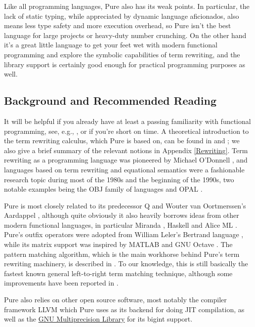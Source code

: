 \documentclass[a4paper,12pt]{article}
\begin{document}
Like all programming languages, Pure also has its weak points. In particular, the lack of static typing, while appreciated by dynamic language aficionados, also means less type safety and more execution overhead, so Pure isn't the best language for large projects or heavy-duty number crunching. On the other hand it's a great little language to get your feet wet with modern functional programming and explore the symbolic capabilities of term rewriting, and the library support is certainly good enough for practical programming purposes as well.

\subsection{Background and Recommended Reading}

It will be helpful if you already have at least a passing familiarity with functional programming, see, e.g., \cite{Hu89}, or \cite{FP} if you're short on time. A theoretical introduction to the term rewriting calculus, which Pure is based on, can be found in \cite{Rewriting} and \cite{DeJo90}; we also give a brief summary of the relevant notions in Appendix \ref{Rewriting}. Term rewriting as a programming language was pioneered by Michael O'Donnell \cite{Do85}, and languages based on term rewriting and equational semantics were a fashionable research topic during most of the 1980s and the beginning of the 1990s, two notable examples being the OBJ family of languages \cite{OBJ} and OPAL \cite{OPAL}.

Pure is most closely related to its predecessor Q \cite{QPL} and Wouter van Oortmerssen's Aardappel \cite{Aardappel}, although quite obviously it also heavily borrows ideas from other modern functional languages, in particular Miranda \cite{Miranda}, Haskell \cite{Haskell98} and Alice ML \cite{Alice}. Pure's outfix operators were adopted from William Leler's Bertrand language \cite{Bertrand}, while its matrix support was inspired by MATLAB \cite{MATLAB} and GNU Octave \cite{Octave}. The pattern matching algorithm, which is the main workhorse behind Pure's term rewriting machinery, is described in \cite{Gr91}. To our knowledge, this is still basically the fastest known general left-to-right term matching technique, although some improvements have been reported in \cite{Adaptive}.

Pure also relies on other open source software, most notably the compiler framework LLVM \cite{LLVM} which Pure uses as its backend for doing JIT compilation, as well as the \href{http://gmplib.org}{GNU Multiprecision Library} for its bigint support.
\end{document}
